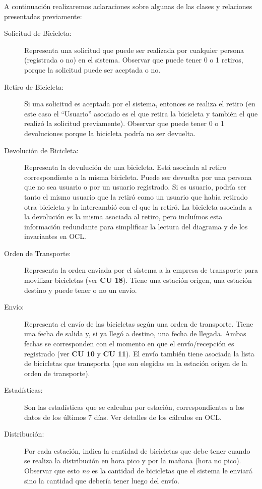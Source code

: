 \documentclass[a4paper, 10pt, twoside]{article}
\begin{document}
A continuación realizaremos aclaraciones sobre algunas de las clases y relaciones presentadas previamente:
\begin{description}
 \item[Solicitud de Bicicleta:] Representa una solicitud que puede ser realizada por cualquier persona (registrada o no) en el sistema. Observar
 que puede tener 0 o 1 retiros, porque la solicitud puede ser aceptada o no.
 \item[Retiro de Bicicleta:] Si una solicitud es aceptada por el sistema, entonces se realiza el retiro (en este caso el ``Usuario''
 asociado es el que retira la bicicleta y también el que realizó la solicitud previamente). Observar que puede tener 0 o 1 devoluciones porque
 la bicicleta podría no ser devuelta.
 \item[Devolución de Bicicleta:] Representa la devulución de una bicicleta. Está asociada al retiro correspondiente a la misma bicicleta. Puede
 ser devuelta por una persona que no sea usuario o por un usuario registrado. Si es usuario, podría ser tanto el mismo usuario que la retiró como
 un usuario que había retirado otra bicicleta y la intercambió con el que la retiró. La bicicleta asociada a la devolución es la misma asociada
 al retiro, pero incluímos esta información redundante para simplificar la lectura del diagrama y de los invariantes en OCL.
 \item[Orden de Transporte:] Representa la orden enviada por el sistema a la empresa de transporte para movilizar bicicletas (ver {\bf CU 18}).
 Tiene una estación orígen, una estación destino y puede tener o no un envío.
 \item[Envío:] Representa el envío de las bicicletas según una orden de transporte. Tiene una fecha de salida y, si ya llegó a destino, una fecha de llegada. Ambas fechas se corresponden con el momento en que el envío/recepción es registrado (ver {\bf CU 10} y {\bf CU 11}). El envío también tiene
 asociada la lista de bicicletas que transporta (que son elegidas en la estación orígen de la orden de transporte).
 \item[Estadísticas:] Son las estadísticas que se calculan por estación, correspondientes a los datos de los últimos 7 días. Ver detalles de los cálculos en OCL.
 \item[Distribución:] Por cada estación, indica la cantidad de bicicletas que debe tener cuando se realiza la distribución en hora pico y por
 la mañana (hora no pico). Observar que esto \emph{no} es la cantidad de bicicletas que el sistema le enviará sino la cantidad que debería tener
 luego del envío.
\end{description}
\end{document}
